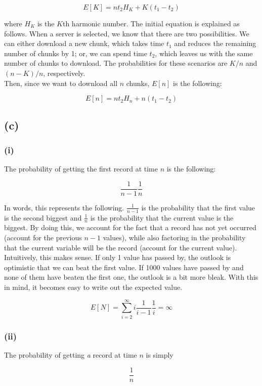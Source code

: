 \documentclass{article}
\begin{document}
\[ E[K] = n t_2 H_K + K(t_1 - t_2) \]

\noindent where $H_K$ is the $K$th harmonic number. The initial equation is explained
as follows. When a server is selected, we know that there are two possibilities.
We can either download a new chunk, which takes time $t_1$ and reduces the remaining
number of chunks by 1; or, we can spend time $t_2$, which leaves us with the same
number of chunks to download. The probabilities for these scenarios are $K / n$
and $(n - K) / n$, respectively.\\

\noindent Then, since we want to download all $n$ chunks, $E[n]$ is the following:

\[ E[n] = n t_2 H_n + n(t_1 - t_2) \]

\subsection*{(c)}
\subsubsection*{(i)}
The probability of getting the first record at time $n$ is the following:

\[ \frac{1}{n - 1} \frac{1}{n} \]

\noindent In words, this represents the following. $\frac{1}{n - 1}$ is the 
probability that the first value is the second biggest and $\frac{1}{n}$ is the 
probability that the current value is the biggest. By doing this, we account
for the fact that a record has not yet occurred (account for the previous $n - 1$
values), while also factoring in the probability that the current variable will 
be the record (account for the current value). Intuitively, this makes
sense. If only 1 value has passed by, the outlook is optimistic that we can beat
the first value. If 1000 values have passed by and none of them have beaten the 
first one, the outlook is a bit more bleak. With this in mind, it becomes easy
to write out the expected value.

\[ E[N] = \sum_{i = 2}^{\infty} i \frac{1}{i - 1} \frac{1}{i} = \infty \]

\subsubsection*{(ii)}
The probability of getting \textit{a} record at time $n$ is simply

\[ \frac{1}{n} \]
\end{document}
